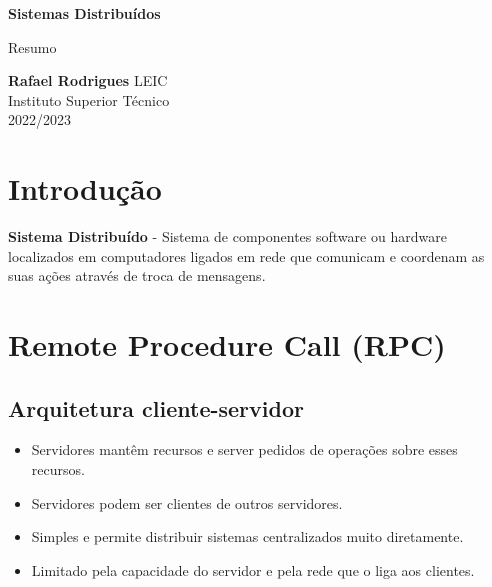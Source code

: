 \documentclass[12pt]{article}
\begin{document}
\begin{titlepage}
    \begin{center}
        \vspace*{1cm}

        \textbf{\LARGE Sistemas Distribuídos}
        \vspace{0.5cm}

        \Large Resumo
        \vspace{1.5cm}

        \textbf{Rafael Rodrigues}
        \vfill
        LEIC \\
        Instituto Superior Técnico \\
        2022/2023
    \end{center}
\end{titlepage}

\tableofcontents

\newpage

\section{Introdução}

\textbf{Sistema Distribuído} - Sistema de componentes software ou hardware localizados em computadores ligados em rede que comunicam e coordenam as suas ações através de troca de mensagens.

\newpage

\section{Remote Procedure Call (RPC)}

\subsection{Arquitetura cliente-servidor}

\begin{itemize}
    \item Servidores mantêm recursos e server pedidos de operações sobre esses recursos.
    \item Servidores podem ser clientes de outros servidores.
    \item Simples e permite distribuir sistemas centralizados muito diretamente.
    \item Limitado pela capacidade do servidor e pela rede que o liga aos clientes.
\end{itemize}

\newpage
\end{document}

